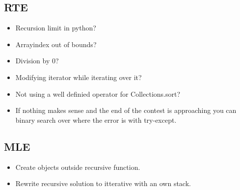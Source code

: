 \documentclass[8pt,a4paper,landscape,oneside]{amsart}
\begin{document}
\begin{multicols*}{3}
    \subsection{RTE}
        \begin{itemize}
        \item Recursion limit in python?
        \item Arrayindex out of bounds?
        \item Division by $0$?
        \item Modifying iterator while iterating over it?
        \item Not using a well definied operator for Collections.sort?
        \item If nothing makes sense and the end of the contest is approaching you 
            can binary search over where the error is with try-except.
        \end{itemize}
    \subsection{MLE}
        \begin{itemize}
        \item Create objects outside recursive function.
        \item Rewrite recursive solution to itterative with an own stack.
        \end{itemize}



\end{multicols*}
\end{document}
